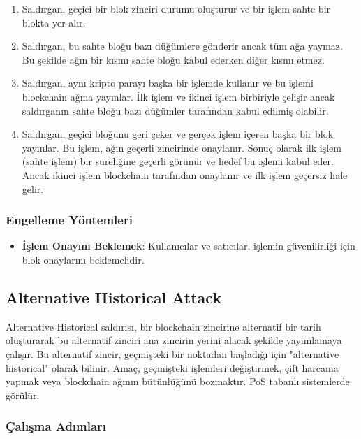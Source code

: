 \begin{enumerate}
    \item Saldırgan, geçici bir blok zinciri durumu oluşturur ve bir işlem sahte bir blokta yer alır.
    \item Saldırgan, bu sahte bloğu bazı düğümlere gönderir ancak tüm ağa yaymaz. Bu şekilde ağın bir kısmı sahte bloğu kabul ederken diğer kısmı etmez.
    \item Saldırgan, aynı kripto parayı başka bir işlemde kullanır ve bu işlemi blockchain ağına yayınlar. İlk işlem ve ikinci işlem birbiriyle çelişir ancak saldırganın sahte bloğu bazı düğümler tarafından kabul edilmiş olabilir.
    \item Saldırgan, geçici bloğunu geri çeker ve gerçek işlem içeren başka bir blok yayınlar. Bu işlem, ağın geçerli zincirinde onaylanır. Sonuç olarak ilk işlem (sahte işlem) bir süreliğine geçerli görünür ve hedef bu işlemi kabul eder. Ancak ikinci işlem blockchain tarafından onaylanır ve ilk işlem geçersiz hale gelir.
\end{enumerate}

\subsubsection{Engelleme Yöntemleri}

\begin{itemize}
    \item \textbf{İşlem Onayını Beklemek}: Kullanıcılar ve satıcılar, işlemin güvenilirliği için blok onaylarını beklemelidir.
\end{itemize}

\newpage

\subsection{Alternative Historical Attack}

Alternative Historical saldırısı, bir blockchain zincirine alternatif bir tarih oluşturarak bu alternatif zinciri ana zincirin yerini alacak şekilde yayımlamaya çalışır. Bu alternatif zincir, geçmişteki bir noktadan başladığı için "alternative historical" olarak bilinir. Amaç, geçmişteki işlemleri değiştirmek, çift harcama yapmak veya blockchain ağının bütünlüğünü bozmaktır. PoS tabanlı sistemlerde görülür.

\subsubsection{Çalışma Adımları}


